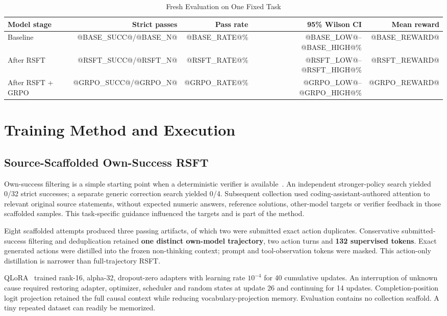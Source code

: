 \documentclass[10pt,journal,onecolumn,a4paper]{IEEEtran}
\begin{document}
\begin{table}[!ht]
\centering
\caption{Fresh Evaluation on One Fixed Task}
\label{tab:results}
\begin{tabular}{lrrrr}
\toprule
Model stage & Strict passes & Pass rate & 95\% Wilson CI & Mean reward \\
\midrule
Baseline & @BASE_SUCC@/@BASE_N@ & @BASE_RATE@\% & @BASE_LOW@--@BASE_HIGH@\% & @BASE_REWARD@ \\
After RSFT & @RSFT_SUCC@/@RSFT_N@ & @RSFT_RATE@\% & @RSFT_LOW@--@RSFT_HIGH@\% & @RSFT_REWARD@ \\
After RSFT + GRPO & @GRPO_SUCC@/@GRPO_N@ & @GRPO_RATE@\% & @GRPO_LOW@--@GRPO_HIGH@\% & @GRPO_REWARD@ \\
\bottomrule
\end{tabular}
\end{table}

\section{Training Method and Execution}
\subsection{Source-Scaffolded Own-Success RSFT}
Own-success filtering is a simple starting point when a deterministic verifier is available~\cite{rest}. An independent stronger-policy search yielded 0/32 strict successes; a separate generic correction search yielded 0/4. Subsequent collection used coding-assistant-authored attention to relevant original source statements, without expected numeric answers, reference solutions, other-model targets or verifier feedback in those scaffolded samples. This task-specific guidance influenced the targets and is part of the method.

Eight scaffolded attempts produced three passing artifacts, of which two were submitted exact action duplicates. Conservative submitted-success filtering and deduplication retained \textbf{one distinct own-model trajectory}, two action turns and \textbf{132 supervised tokens}. Exact generated actions were distilled into the frozen non-thinking context; prompt and tool-observation tokens were masked. This action-only distillation is narrower than full-trajectory RSFT.

QLoRA~\cite{qlora} trained rank-16, alpha-32, dropout-zero adapters with learning rate $10^{-4}$ for 40 cumulative updates. An interruption of unknown cause required restoring adapter, optimizer, scheduler and random states at update 26 and continuing for 14 updates. Completion-position logit projection retained the full causal context while reducing vocabulary-projection memory. Evaluation contains no collection scaffold. A tiny repeated dataset can readily be memorized.
\end{document}
